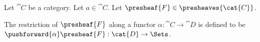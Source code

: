 \begin{definition}[Restriction]
Let $\cat{C}$ be a category.
Let $a \in \cat{C}$.
Let $\presheaf{F} \in \presheaves{\cat{C}}$.

The restriction of $\presheaf{F}$ along a functor $\alpha:\cat{C} \rightarrow \cat{D}$ 
is defined to be $\pushforward{\alpha}\presheaf{F}: \cat{D} \rightarrow \Sets$.
\end{definition}